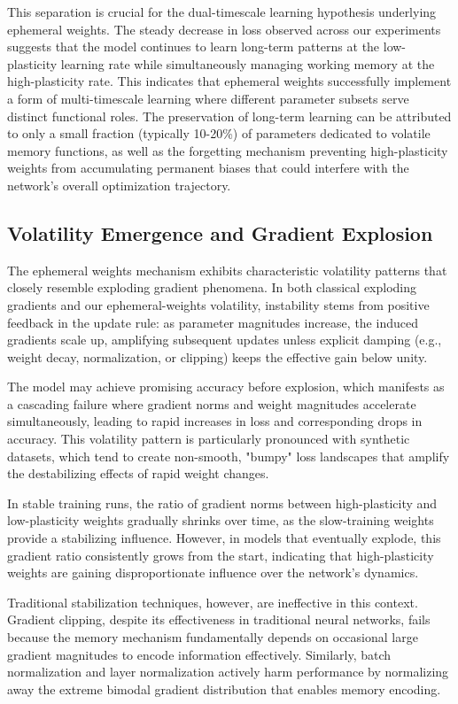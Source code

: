 This separation is crucial for the dual-timescale learning hypothesis underlying ephemeral weights. The steady decrease in loss observed across our experiments suggests that the model continues to learn long-term patterns at the low-plasticity learning rate while simultaneously managing working memory at the high-plasticity rate. This indicates that ephemeral weights successfully implement a form of multi-timescale learning where different parameter subsets serve distinct functional roles. The preservation of long-term learning can be attributed to only a small fraction (typically 10-20\%) of parameters dedicated to volatile memory functions, as well as the forgetting mechanism preventing high-plasticity weights from accumulating permanent biases that could interfere with the network's overall optimization trajectory.

\subsection{Volatility Emergence and Gradient Explosion}

The ephemeral weights mechanism exhibits characteristic volatility patterns that closely resemble exploding gradient phenomena. In both classical exploding gradients and our ephemeral-weights volatility, instability stems from positive feedback in the update rule: as parameter magnitudes increase, the induced gradients scale up, amplifying subsequent updates unless explicit damping (e.g., weight decay, normalization, or clipping) keeps the effective gain below unity. 

The model may achieve promising accuracy before explosion, which manifests as a cascading failure where gradient norms and weight magnitudes accelerate simultaneously, leading to rapid increases in loss and corresponding drops in accuracy. This volatility pattern is particularly pronounced with synthetic datasets, which tend to create non-smooth, "bumpy" loss landscapes that amplify the destabilizing effects of rapid weight changes. 

In stable training runs, the ratio of gradient norms between high-plasticity and low-plasticity weights gradually shrinks over time, as the slow-training weights provide a stabilizing influence. However, in models that eventually explode, this gradient ratio consistently grows from the start, indicating that high-plasticity weights are gaining disproportionate influence over the network's dynamics. 

Traditional stabilization techniques, however, are ineffective in this context.
Gradient clipping, despite its effectiveness in traditional neural networks, fails because the memory mechanism fundamentally depends on occasional large gradient magnitudes to encode information effectively. Similarly, batch normalization and layer normalization actively harm performance by normalizing away the extreme bimodal gradient distribution that enables memory encoding.

